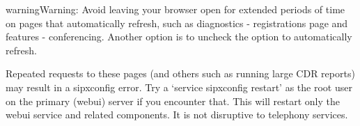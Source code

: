 \documentclass[letterpaper,10pt,english]{sphinxmanual}
\begin{document}
\begin{sphinxadmonition}{warning}{Warning:}
Avoid leaving your browser open for extended periods of time on pages that automatically refresh, such as diagnostics - registrations page and features - conferencing.
Another option is to uncheck the option to automatically refresh.


Repeated requests to these pages (and others such as running large CDR reports) may result in a sipxconfig  error.
Try a ‘service sipxconfig restart’ as the root user on the primary (webui) server if you encounter that.
This will restart only the webui service and related components. It is not disruptive to telephony services.
\end{sphinxadmonition}
\end{document}
